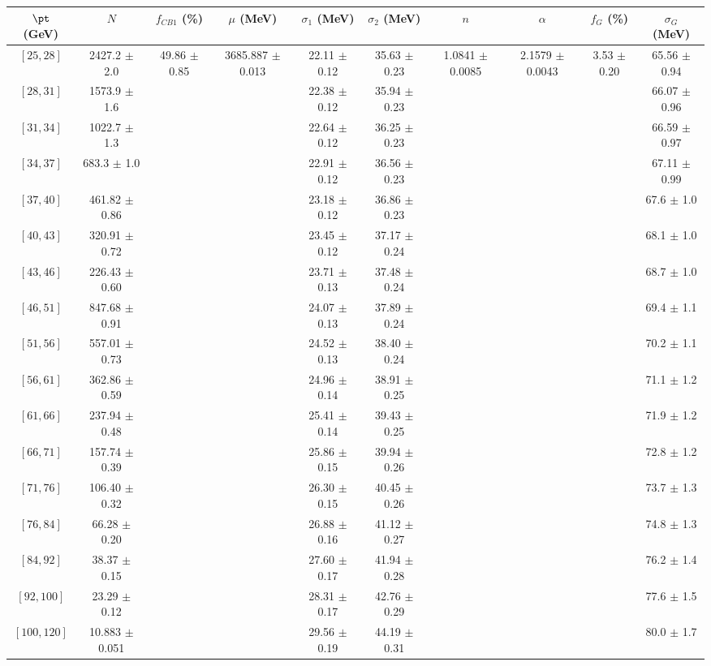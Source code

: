 \begin{tabular}{c||c|c|c|c|c|c|c|c|c}
$\pt$ (GeV) & $N$ & $f_{CB1}$ (\%)  & $\mu$ (MeV) & $\sigma_1$ (MeV) & $\sigma_2$ (MeV) & $n$ & $\alpha$ & $f_G$ (\%) & $\sigma_G$ (MeV) \\
\hline
$[25, 28]$ & 2427.2 $\pm$ 2.0 & \multirow{17}{*}{49.86 $\pm$ 0.85} & \multirow{17}{*}{3685.887 $\pm$ 0.013} & 22.11 $\pm$ 0.12 & 35.63 $\pm$ 0.23 & \multirow{17}{*}{1.0841 $\pm$ 0.0085} & \multirow{17}{*}{2.1579 $\pm$ 0.0043} & \multirow{17}{*}{3.53 $\pm$ 0.20} & 65.56 $\pm$ 0.94\\
$[28, 31]$ & 1573.9 $\pm$ 1.6 &  &  & 22.38 $\pm$ 0.12 & 35.94 $\pm$ 0.23 &  &  &  & 66.07 $\pm$ 0.96\\
$[31, 34]$ & 1022.7 $\pm$ 1.3 &  &  & 22.64 $\pm$ 0.12 & 36.25 $\pm$ 0.23 &  &  &  & 66.59 $\pm$ 0.97\\
$[34, 37]$ & 683.3 $\pm$ 1.0 &  &  & 22.91 $\pm$ 0.12 & 36.56 $\pm$ 0.23 &  &  &  & 67.11 $\pm$ 0.99\\
$[37, 40]$ & 461.82 $\pm$ 0.86 &  &  & 23.18 $\pm$ 0.12 & 36.86 $\pm$ 0.23 &  &  &  & 67.6 $\pm$ 1.0\\
$[40, 43]$ & 320.91 $\pm$ 0.72 &  &  & 23.45 $\pm$ 0.12 & 37.17 $\pm$ 0.24 &  &  &  & 68.1 $\pm$ 1.0\\
$[43, 46]$ & 226.43 $\pm$ 0.60 &  &  & 23.71 $\pm$ 0.13 & 37.48 $\pm$ 0.24 &  &  &  & 68.7 $\pm$ 1.0\\
$[46, 51]$ & 847.68 $\pm$ 0.91 &  &  & 24.07 $\pm$ 0.13 & 37.89 $\pm$ 0.24 &  &  &  & 69.4 $\pm$ 1.1\\
$[51, 56]$ & 557.01 $\pm$ 0.73 &  &  & 24.52 $\pm$ 0.13 & 38.40 $\pm$ 0.24 &  &  &  & 70.2 $\pm$ 1.1\\
$[56, 61]$ & 362.86 $\pm$ 0.59 &  &  & 24.96 $\pm$ 0.14 & 38.91 $\pm$ 0.25 &  &  &  & 71.1 $\pm$ 1.2\\
$[61, 66]$ & 237.94 $\pm$ 0.48 &  &  & 25.41 $\pm$ 0.14 & 39.43 $\pm$ 0.25 &  &  &  & 71.9 $\pm$ 1.2\\
$[66, 71]$ & 157.74 $\pm$ 0.39 &  &  & 25.86 $\pm$ 0.15 & 39.94 $\pm$ 0.26 &  &  &  & 72.8 $\pm$ 1.2\\
$[71, 76]$ & 106.40 $\pm$ 0.32 &  &  & 26.30 $\pm$ 0.15 & 40.45 $\pm$ 0.26 &  &  &  & 73.7 $\pm$ 1.3\\
$[76, 84]$ & 66.28 $\pm$ 0.20 &  &  & 26.88 $\pm$ 0.16 & 41.12 $\pm$ 0.27 &  &  &  & 74.8 $\pm$ 1.3\\
$[84, 92]$ & 38.37 $\pm$ 0.15 &  &  & 27.60 $\pm$ 0.17 & 41.94 $\pm$ 0.28 &  &  &  & 76.2 $\pm$ 1.4\\
$[92, 100]$ & 23.29 $\pm$ 0.12 &  &  & 28.31 $\pm$ 0.17 & 42.76 $\pm$ 0.29 &  &  &  & 77.6 $\pm$ 1.5\\
$[100, 120]$ & 10.883 $\pm$ 0.051 &  &  & 29.56 $\pm$ 0.19 & 44.19 $\pm$ 0.31 &  &  &  & 80.0 $\pm$ 1.7\\
\end{tabular}
